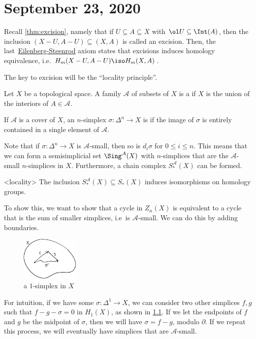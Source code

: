 \documentclass{standalone}
\begin{document}
\chapter{September 23, 2020}
Recall \cref{thm:excision}, namely that if \(U \subseteq A \subseteq X\)
with \(\ol U \subseteq \Int(A)\), then the inclusion
\((X - U, A - U) \subseteq (X, A)\) is called an excision.
Then, the last~\hyperref[thm:eilenberg-steenrod]{Eilenberg-Steenrod} axiom
states that excisions induces homology equivalence, i.e.
\(H_m(X - U, A - U) \iso H_m(X, A)\).

The key to excision will be the ``locality principle''.
\begin{definition}
  Let \(X\) be a topological space. A family \(\mathcal A\) of subsets of \(X\)
  is a  if \(X\) is the union of the interiors of
  \(A \in \mathcal A\).
\end{definition}
\begin{definition}
  If \(\mathcal A\) is a cover of \(X\), an \(n\)-simplex
  \(\sigma \colon \Delta^n \to X\) is 
  if the image of \(\sigma\) is entirely contained in
  a single element of \(\mathcal A\).
\end{definition}

Note that if \(\sigma \colon \Delta^n \to X\) is \(\mathcal A\)-small,
then so is \(d_i \sigma\) for \(0 \leq i \leq n\).
This means that we can form a semisimplicial set
\(\Sing^{\mathcal A}(X)\) with \(n\)-simplices that are
the \(\mathcal A\)-small \(n\)-simplices in \(X\).
Furthermore, a chain complex \(S_*^{\mathcal A}(X)\) can be formed.

\begin{theorem}<locality>
  The inclusion \(S_*^{\mathcal A}(X) \subseteq S_*(X)\)
  induces isomorphisms on homology groups.
\end{theorem}

To show this, we want to show that a cycle in \(Z_n(X)\) is equivalent
to a cycle that is the sum of smaller simplices, i.e\ is \(\mathcal A\)-small.
We can do this by adding boundaries.

\begin{figure}
  \centering
  \includegraphics[width=0.25\textwidth]{18_905-200923-1.png}
  \caption{a \(1\)-simplex in \(X\)}%
  \label{fig:locality-1}
\end{figure}
For intuition, if we have some \(\sigma \colon \Delta^1 \to X\),
we can consider two other simplices \(f, g\) such that \(f - g - \sigma = 0\)
in \(H_1(X)\), as shown in \cref{fig:locality-1}.
If we let the endpoints of \(f\) and \(g\) be the midpoint of \(\sigma\),
then we will have \(\sigma = f - g\), modulo \(\partial\).
If we repeat this process, we will eventually have simplices that are
\(\mathcal A\)-small.
\end{document}
